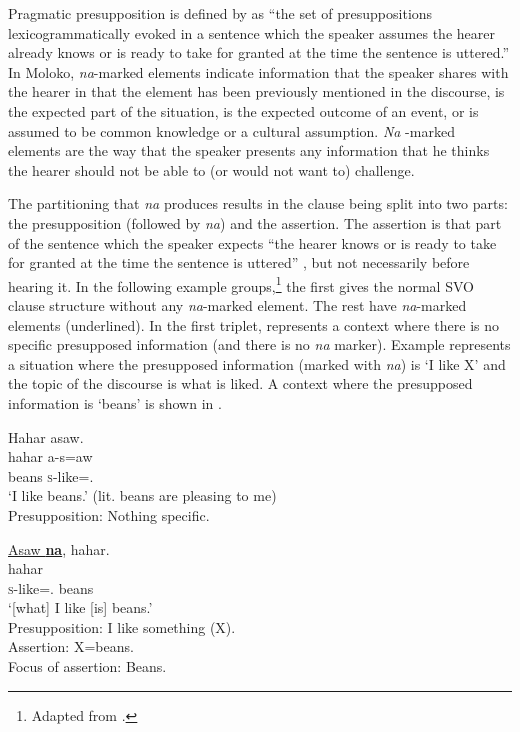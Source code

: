 Pragmatic presupposition is defined by \citet[52]{Lambrecht1994} as “the set of presuppositions lexicogrammatically evoked in a sentence which the speaker assumes the hearer already knows or is ready to take for granted at the time the sentence is uttered.”  In Moloko, \textit{na}{}-marked elements indicate information that the speaker shares with the hearer in that the element has been previously mentioned in the discourse, is the expected part of the situation, is the expected outcome of an event, or is assumed to be common knowledge or a cultural assumption. \textit{Na} -marked elements are the way that the speaker presents any information that he thinks the hearer should not be able to (or would not want to) challenge. 

\largerpage
The partitioning that \textit{na} produces results in the clause being split into two parts:  the presupposition (followed by \textit{na}) and the assertion. The assertion is that part of the sentence which the speaker expects “the hearer knows or is ready to take for granted at the time the sentence is uttered” \citep[52]{Lambrecht1994}, but not necessarily before hearing it.  In the following example groups,\footnote{Adapted from \citealt{Boyd2002}.} the first gives the normal SVO clause structure without any \textit{na}{}-marked element. The rest have \textit{na}-marked elements (underlined). In the first triplet,  represents a context where there is no specific presupposed information (and there is no \textit{na} marker). Example  represents a situation where the presupposed information (marked with  \textit{na}) is ‘I like X’ and the topic of the discourse is what is liked. A context where the presupposed information is ‘beans’ is shown in .

\ea \label{ex:11:5}
Hahar  asaw. \\
\gll  hahar   a-s=aw \\
      beans   \textsc{s}-like={\oneS}.{\IO}\\
\glt  ‘I like beans.’ (lit. beans are pleasing to me) \\
  Presupposition:     Nothing specific.
\z

\ea \label{ex:11:6}
\underline{Asaw  \textbf{na}},  hahar. \\
\gll  {}   hahar\\
      \textsc{s}-like={\oneS}.{\IO} {\PSP}  beans\\
\glt  ‘[what] I like [is] beans.’\\
  Presupposition:     I like something (X). \\
Assertion:     X=beans. \\
Focus of assertion:   Beans.
\z

